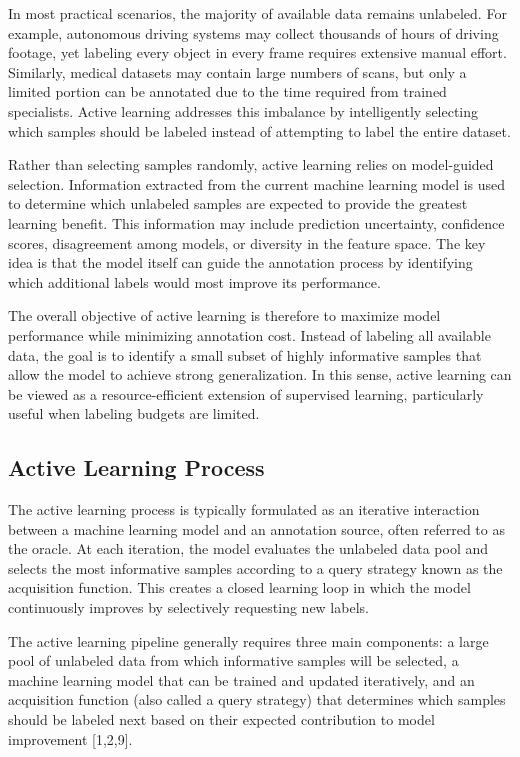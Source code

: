 \documentclass{article}
\renewcommand{\cite}[1]{[#1]}
\begin{document}
In most practical scenarios, the majority of available data remains unlabeled. For example, autonomous driving systems may collect thousands of hours of driving footage, yet labeling every object in every frame requires extensive manual effort. Similarly, medical datasets may contain large numbers of scans, but only a limited portion can be annotated due to the time required from trained specialists. Active learning addresses this imbalance by intelligently selecting which samples should be labeled instead of attempting to label the entire dataset.

Rather than selecting samples randomly, active learning relies on model-guided selection. Information extracted from the current machine learning model is used to determine which unlabeled samples are expected to provide the greatest learning benefit. This information may include prediction uncertainty, confidence scores, disagreement among models, or diversity in the feature space. The key idea is that the model itself can guide the annotation process by identifying which additional labels would most improve its performance.

The overall objective of active learning is therefore to maximize model performance while minimizing annotation cost. Instead of labeling all available data, the goal is to identify a small subset of highly informative samples that allow the model to achieve strong generalization. In this sense, active learning can be viewed as a resource-efficient extension of supervised learning, particularly useful when labeling budgets are limited.

\subsection{Active Learning Process}

The active learning process is typically formulated as an iterative interaction between a machine learning model and an annotation source, often referred to as the oracle. At each iteration, the model evaluates the unlabeled data pool and selects the most informative samples according to a query strategy known as the acquisition function. This creates a closed learning loop in which the model continuously improves by selectively requesting new labels.

The active learning pipeline generally requires three main components: a large pool of unlabeled data from which informative samples will be selected, a machine learning model that can be trained and updated iteratively, and an acquisition function (also called a query strategy) that determines which samples should be labeled next based on their expected contribution to model improvement \cite{1,2,9}.
\end{document}

